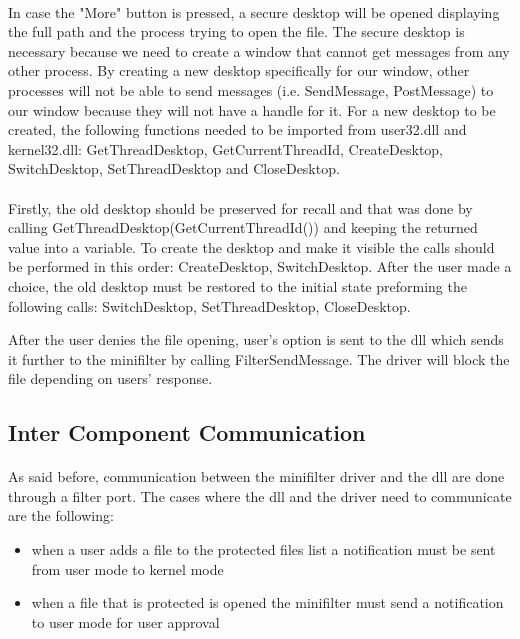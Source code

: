 		\paragraph{}
		In case the "More" button is pressed, a secure desktop will be opened displaying the full path and the process trying to open the file. The secure desktop is necessary because we need to create a window that cannot get messages from any other process. By creating a new desktop specifically for our window, other processes will not be able to send messages (i.e. SendMessage, PostMessage) to our window because they will not have a handle for it. For a new desktop to be created, the following functions needed to be imported from user32.dll and kernel32.dll: GetThreadDesktop, GetCurrentThreadId, CreateDesktop, SwitchDesktop, SetThreadDesktop and CloseDesktop. 
		
		\paragraph{}
		Firstly, the old desktop should be preserved for recall and that was done by calling GetThreadDesktop(GetCurrentThreadId()) and keeping the returned value into a variable. To create the desktop and make it visible the calls should be performed in this order: CreateDesktop, SwitchDesktop. After the user made a choice, the old desktop must be restored to the initial state preforming the following calls: SwitchDesktop, SetThreadDesktop, CloseDesktop. 
		
		After the user denies the file opening, user's option is sent to the dll which sends it further to the minifilter by calling FilterSendMessage. The driver will block the file depending on users' response. 
	
	
		\subsection{Inter Component Communication}
		\paragraph{}
		As said before, communication between the minifilter driver and the dll are done through a filter port. The cases where the dll and the driver need to communicate are the following:
		\begin{itemize}
			\item when a user adds a file to the protected files list a notification must be sent from user mode to kernel mode
			\item when a file that is protected is opened the minifilter must send a notification to user mode for user approval
		\end{itemize}
			
